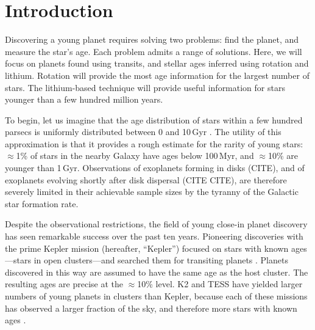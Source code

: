 \documentclass[11pt,twocolumn,tighten]{aastex63}
\begin{document}

\section{Introduction}
\label{sec:intro}

Discovering a young planet requires solving two problems: find the
planet, and measure the star's age.  Each problem admits a range of
solutions.  Here, we will focus on planets found using transits,
and stellar ages inferred using rotation and lithium.  Rotation
will provide the most age information for the largest number of
stars.  The lithium-based technique will provide useful information
for stars younger than a few hundred million years.

To begin, let us imagine that the age distribution of stars within a
few hundred parsecs is uniformly distributed between 0 and 10\,Gyr
\citep[e.g.][]{Nordstrom_2004}.  
The utility of this approximation is that it provides a rough estimate
for the rarity of young stars:
$\approx$1\% of stars in the nearby Galaxy have ages below 100\,Myr,
and $\approx$10\% are younger than 1\,Gyr.
Observations of exoplanets forming in disks (CITE), and of exoplanets
evolving shortly after disk dispersal (CITE CITE), are therefore
severely limited in their achievable sample sizes by the
tyranny of the Galactic star formation rate.



Despite the observational restrictions, the field of young close-in
planet discovery has seen remarkable success over the past ten years.
Pioneering discoveries with the prime Kepler mission (hereafter,
``Kepler'') focused on stars with known ages---stars in open
clusters---and searched them for transiting planets
\citep{Meibom_2013}.  Planets discovered in this way are assumed to
have the same age as the host cluster.  The resulting ages are precise
at the $\approx$10\% level.  K2 and TESS have yielded larger numbers
of young planets in clusters than Kepler, because each of these
missions has observed a larger fraction of the sky, and therefore more
stars with known ages
\citep[e.g.][]{Mann_K2_25_2016,Mann_2017,Curtis_2018,Livingston_2018,David_2019,Bouma_2020_toi837,Rizzuto_2020,Plavchan_2020,Newton_2021,Nardiello_2022,Tofflemire_2021,Zhou_2022,Zakhozhay_2022,Wood_2023}.
\end{document}

